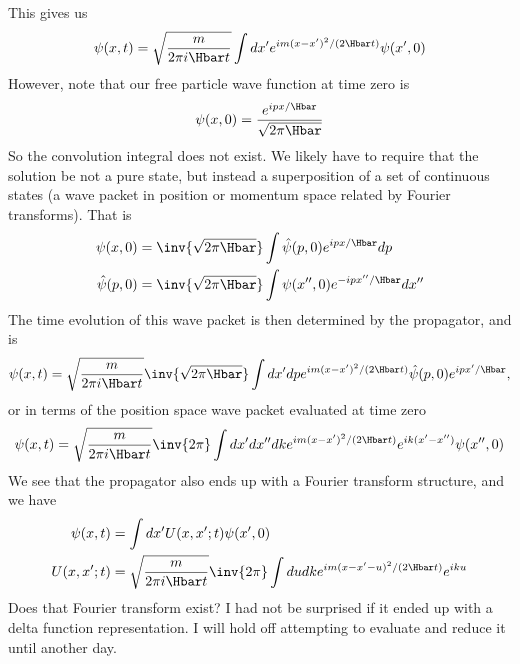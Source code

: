 {\begin{equation}
\end{equation}
%
This gives us
\begin{equation}\label{eqn:qmIexamPractice2007Dec:1f:40}
\psi(x, t)
=
\sqrt{\frac{m}{2 \pi i \Hbar t}}
\int dx'
e^{i m (x-x')^2/ (2 \Hbar t)} \psi(x', 0)
\end{equation}
%
However, note that our free particle wave function at time zero is
%
\begin{equation}\label{eqn:qmIexamPractice2007Dec:1f:50}
\psi(x, 0) = \frac{e^{i p x/\Hbar}}{\sqrt{2 \pi \Hbar}}
\end{equation}
%
So the convolution integral  does not exist.  We likely have to require that the solution be not a pure state, but instead a superposition of a set of continuous states (a wave packet in position or momentum space related by Fourier transforms).  That is
%
\begin{equation}\label{eqn:qmIexamPractice2007Dec:1f:60}
\begin{aligned}
\psi(x, 0) &=
\inv{\sqrt{2 \pi \Hbar}} \int \hat{\psi}(p, 0) e^{i p x/\Hbar} dp \\
\hat{\psi}(p, 0) &=
\inv{\sqrt{2 \pi \Hbar}} \int \psi(x'', 0) e^{-i p x''/\Hbar} dx''
\end{aligned}
\end{equation}
%
The time evolution of this wave packet is then determined by the propagator, and is
%
\begin{equation}\label{eqn:qmIexamPractice2007Dec:1f:70}
\psi(x,t) =
\sqrt{\frac{m}{2 \pi i \Hbar t}}
\inv{\sqrt{2 \pi \Hbar}}
\int dx' dp
e^{i m (x-x')^2/ (2 \Hbar t)}
\hat{\psi}(p, 0) e^{i p x'/\Hbar} ,
\end{equation}
%
or in terms of the position space wave packet evaluated at time zero
%
\begin{equation}\label{eqn:qmIexamPractice2007Dec:1f:80}
\psi(x,t) =
\sqrt{\frac{m}{2 \pi i \Hbar t}}
\inv{2 \pi}
\int dx' dx'' dk
e^{i m (x-x')^2/ (2 \Hbar t)}
e^{i k (x' - x'')} \psi(x'', 0)
\end{equation}
%
We see that the propagator also ends up with a Fourier transform structure, and we have
%
\begin{equation}\label{eqn:qmIexamPractice2007Dec:1f:90}
\begin{aligned}
\psi(x,t) &= \int dx' U(x, x' ; t) \psi(x', 0) \\
U(x, x' ; t) &=
\sqrt{\frac{m}{2 \pi i \Hbar t}}
\inv{2 \pi}
\int du dk
e^{i m (x - x' - u)^2/ (2 \Hbar t)}
e^{i k u }
\end{aligned}
\end{equation}
%
Does that Fourier transform exist?  I had not be surprised if it ended up with a delta function representation.  I will hold off attempting to evaluate and reduce it until another day.

} %
